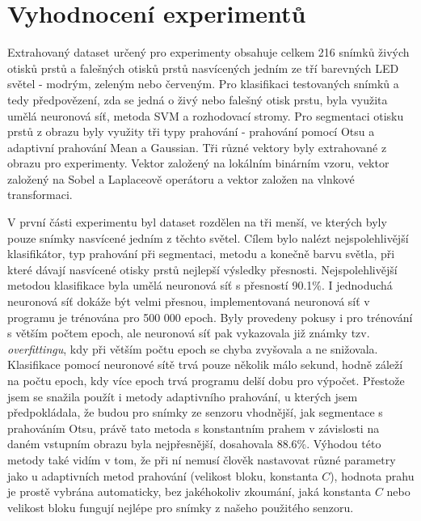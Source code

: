 \section{Vyhodnocení experimentů}
Extrahovaný dataset určený pro experimenty obsahuje celkem 216 snímků živých otisků prstů a falešných otisků prstů nasvícených jedním ze tří barevných LED světel - modrým, zeleným nebo červeným. Pro klasifikaci testovaných snímků a tedy předpovězení, zda se jedná o živý nebo falešný otisk prstu, byla využita umělá neuronová síť, metoda SVM a rozhodovací stromy. Pro segmentaci otisku prstů z obrazu byly využity tři typy prahování - prahování pomocí Otsu a adaptivní prahování Mean a Gaussian. Tři různé vektory byly extrahované z obrazu pro experimenty. Vektor založený na lokálním binárním vzoru, vektor založený na Sobel a Laplaceově operátoru a vektor založen na vlnkové transformaci.

V první části experimentu byl dataset rozdělen na tři menší, ve kterých byly pouze snímky nasvícené jedním z těchto světel. Cílem bylo nalézt nejspolehlivější klasifikátor, typ prahování při segmentaci, metodu a konečně barvu světla, při které dávají nasvícené otisky prstů nejlepší výsledky přesnosti. Nejspolehlivější metodou klasifikace byla umělá neuronová síť s přesností 90.1\%. I jednoduchá neuronová síť dokáže být velmi přesnou, implementovaná neuronová síť v programu je trénována pro 500 000 epoch. Byly provedeny pokusy i pro trénování s větším počtem epoch, ale neuronová síť pak vykazovala již známky tzv. \textit{overfittingu}, kdy při větším počtu epoch se chyba zvyšovala a ne snižovala. Klasifikace pomocí neuronové sítě trvá pouze několik málo sekund, hodně záleží na počtu epoch, kdy více epoch trvá programu delší dobu pro výpočet. Přestože jsem se snažila použít i metody adaptivního prahování, u kterých jsem předpokládala, že budou pro snímky ze senzoru vhodnější, jak segmentace s prahováním Otsu, právě tato metoda s konstantním prahem v závislosti na daném vstupním obrazu byla nejpřesnější, dosahovala 88.6\%. Výhodou této metody také vidím v tom, že při ní nemusí člověk nastavovat různé parametry jako u adaptivních metod prahování (velikost bloku, konstanta $C$), hodnota prahu je prostě vybrána automaticky, bez jakéhokoliv zkoumání, jaká konstanta $C$ nebo velikost bloku fungují nejlépe pro snímky z našeho použitého senzoru.






\label{citace}



